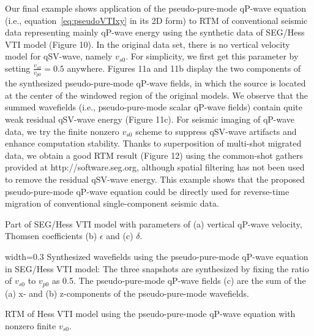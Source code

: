Our final example shows application of the pseudo-pure-mode qP-wave equation (i.e., equation~\ref{eq:pseudoVTIxy} in its 2D form) 
 to RTM of conventional seismic data representing mainly qP-wave energy using the synthetic data of
 SEG/Hess VTI model (Figure 10).
In the original data set, there is no vertical velocity model for qSV-wave, namely $v_{s0}$.
 For simplicity, we first get this parameter by setting $\frac{v_{s0}}{v_{p0}}=0.5$ anywhere.
Figures 11a and 11b display the two components of the synthesized pseudo-pure-mode qP-wave fields,
 in which the source is located at the center of the windowed region of the original models. 
 We observe that the summed wavefields (i.e., pseudo-pure-mode scalar qP-wave fields) contain quite weak
 residual qSV-wave energy (Figure 11c).
For seismic imaging of qP-wave data, we try the finite nonzero $v_{s0}$ scheme \cite[]{fletcher:2009}
 to suppress qSV-wave artifacts and enhance computation stability.
Thanks to superposition of multi-shot migrated data, we obtain a good RTM result (Figure 12) 
using the common-shot gathers provided at http://software.seg.org, although spatial filtering
has not been used to remove the residual qSV-wave energy. This example shows that the proposed pseudo-pure-mode
qP-wave equation could be directly used for reverse-time migration of conventional single-component seismic data.

{
Part of SEG/Hess VTI model with parameters of (a) vertical qP-wave velocity, Thomsen coefficients 
(b) $\epsilon$ and (c) $\delta$.
}

{width=0.3\textwidth}
{
Synthesized wavefields using the pseudo-pure-mode qP-wave equation in SEG/Hess VTI model:
The three snapshots are synthesized by fixing the ratio of $v_{s0}$ to $v_{p0}$ as 0.5.  
The pseudo-pure-mode qP-wave fields (c) are the sum of the (a) x- and (b) z-components 
of the pseudo-pure-mode wavefields.
}

{
RTM of Hess VTI model using the pseudo-pure-mode qP-wave equation with nonzero finite $v_{s0}$.
}
